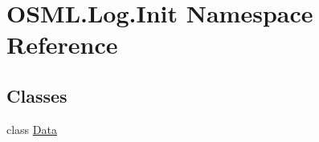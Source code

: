 \hypertarget{namespaceOSML_1_1Log_1_1Init}{}\section{O\+S\+M\+L.\+Log.\+Init Namespace Reference}
\label{namespaceOSML_1_1Log_1_1Init}
\subsection*{Classes}
\begin{DoxyCompactItemize}
\item 
class \mbox{\hyperlink{classOSML_1_1Log_1_1Init_1_1Data}{Data}}
\end{DoxyCompactItemize}
